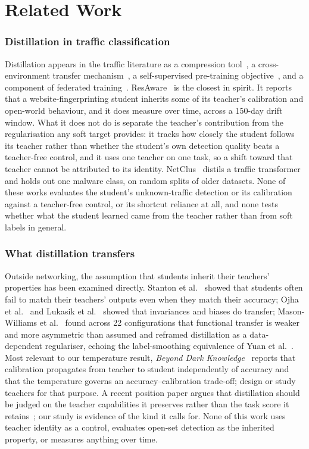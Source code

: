 \documentclass[journal]{IEEEtran}
\begin{document}
\section{Related Work}
\label{sec:related}

\subsubsection*{Distillation in traffic classification}
Distillation appears in the traffic literature as a compression tool~\cite{netclus,prunedtrees,futureinternet2026}, a cross-environment transfer mechanism~\cite{resaware,ciphersight}, a self-supervised pre-training objective~\cite{mmaeflowmix}, and a component of federated training~\cite{tnsm2026fedkd}. ResAware~\cite{resaware} is the closest in spirit. It reports that a website-fingerprinting student inherits some of its teacher's calibration and open-world behaviour, and it does measure over time, across a 150-day drift window. What it does not do is separate the teacher's contribution from the regularisation any soft target provides: it tracks how closely the student follows its teacher rather than whether the student's own detection quality beats a teacher-free control, and it uses one teacher on one task, so a shift toward that teacher cannot be attributed to its identity. NetClus~\cite{netclus} distils a traffic transformer and holds out one malware class, on random splits of older datasets. None of these works evaluates the student's unknown-traffic detection or its calibration against a teacher-free control, or its shortcut reliance at all, and none tests whether what the student learned came from the teacher rather than from soft labels in general.

\subsubsection*{What distillation transfers}
Outside networking, the assumption that students inherit their teachers' properties has been examined directly. Stanton et al.~\cite{stanton2021} showed that students often fail to match their teachers' outputs even when they match their accuracy; Ojha et al.~\cite{ojha2023} and Lukasik et al.~\cite{teacherspet} showed that invariances and biases do transfer; Mason-Williams et al.~\cite{functionalkd} found across 22 configurations that functional transfer is weaker and more asymmetric than assumed and reframed distillation as a data-dependent regulariser, echoing the label-smoothing equivalence of Yuan et al.~\cite{yuan2020revisiting}. Most relevant to our temperature result, \emph{Beyond Dark Knowledge}~\cite{beyonddarkknowledge} reports that calibration propagates from teacher to student independently of accuracy and that the temperature governs an accuracy--calibration trade-off; \cite{cud2026,teachercalibration2025} design or study teachers for that purpose. A recent position paper argues that distillation should be judged on the teacher capabilities it preserves rather than the task score it retains~\cite{kdloses2026}; our study is evidence of the kind it calls for. None of this work uses teacher identity as a control, evaluates open-set detection as the inherited property, or measures anything over time.
\end{document}

